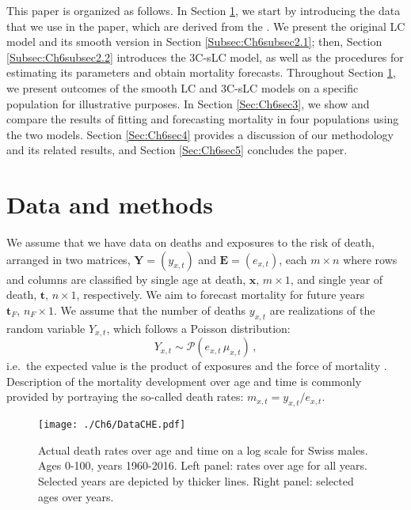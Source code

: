\documentclass[Thesis]{subfiles}
\begin{document}
This paper is organized as follows. In Section \ref{Sec:Ch6sec2}, we start by introducing the data that we use in the paper, which are derived from the \cite{HMD}. We present the original LC model and its smooth version in Section \ref{Subsec:Ch6subsec2.1}; then, Section \ref{Subsec:Ch6subsec2.2} introduces the 3C-sLC model, as well as the procedures for estimating its parameters and obtain mortality forecasts. Throughout Section \ref{Sec:Ch6sec2}, we present outcomes of the smooth LC and 3C-sLC models on a specific population for illustrative purposes. In Section \ref{Sec:Ch6sec3}, we show and compare the results of fitting and forecasting mortality in four populations using the two models. Section \ref{Sec:Ch6sec4} provides a discussion of our methodology and its related results, and Section \ref{Sec:Ch6sec5} concludes the paper. 


\section{Data and methods}\label{Sec:Ch6sec2}

We assume that we have data on deaths and exposures to the risk of death, arranged in two matrices, $\bm{Y} = (y_{x,t})$ and $\bm{E} = (e_{x,t})$, each $m \times n$ where rows and columns are classified by single age at death, $\bm{x}, \,m \times 1$, and single year of death, $\bm{t}, \,n \times 1$, respectively. We aim to forecast mortality for future years $\bm{t}_{F}, \,n_{F} \times 1$.
We assume that the number of deaths $y_{x,t}$ are realizations of the random variable $Y_{x,t}$, which follows a Poisson distribution:
\begin{equation}\label{eq:Poisson}
Y_{x,t} \sim \mathcal{P}(e_{x,t}\,\mu_{x,t}) \, ,
\end{equation}
i.e.~the expected value is the product of exposures and the force of mortality \citep{brillinger1986biometrics}. Description of the mortality development over age and time is commonly provided by portraying the so-called death rates: $m_{x,t}= y_{x,t}/e_{x,t}$. 

\begin{figure}[!ht]\centering
	\texttt{[image: ./Ch6/DataCHE.pdf]}
	\caption{\label{fig:DataCHE} Actual death rates over age and time on a log scale for Swiss males. Ages 0-100, years 1960-2016. Left panel: rates over age for all years. Selected years are depicted by thicker lines. Right panel: selected ages over years.}  
\end{figure}
\end{document}
